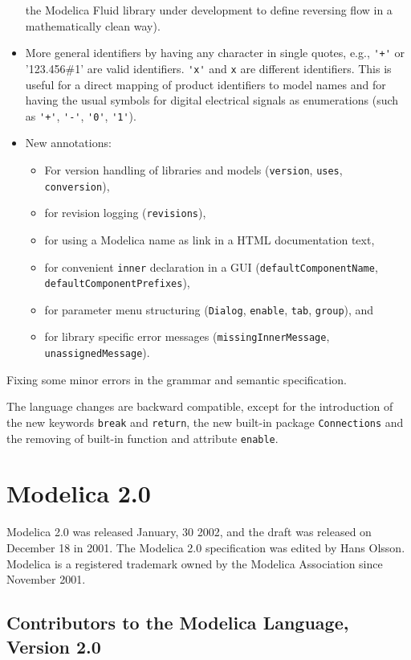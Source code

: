 \begin{itemize}
  the Modelica Fluid library under development to define reversing flow
  in a mathematically clean way).
\item
  More general identifiers by having any character in single quotes,
  e.g., \lstinline!'+'! or '123.456\#1' are valid identifiers. \lstinline!'x'! and \lstinline!x! are
  different identifiers. This is useful for a direct mapping of product
  identifiers to model names and for having the usual symbols for
  digital electrical signals as enumerations (such as \lstinline!'+'!, \lstinline!'-'!, \lstinline!'0'!,
  \lstinline!'1'!).
\item
  New annotations:
\begin{itemize}
\item For version handling of libraries and models (\lstinline!version!, \lstinline!uses!,
\lstinline!conversion!),
\item for revision logging (\lstinline!revisions!),
\item for using a Modelica name as link in a HTML documentation text,
\item for convenient \lstinline!inner! declaration in a GUI (\lstinline!defaultComponentName!,
\lstinline!defaultComponentPrefixes!),
\item for parameter menu structuring (\lstinline!Dialog!, \lstinline!enable!, \lstinline!tab!,
\lstinline!group!), and
\item for library specific error messages (\lstinline!missingInnerMessage!,
\lstinline!unassignedMessage!).
\end{itemize}
\end{itemize}
Fixing some minor errors in the grammar and semantic specification.

The language changes are backward compatible, except for the introduction of the new keywords \lstinline!break! and \lstinline!return!, the new built-in package \lstinline!Connections! and the removing of built-in function and attribute \lstinline!enable!.

\section{Modelica 2.0}\label{modelica-2-0}

Modelica 2.0 was released January, 30 2002, and the draft was released
on December 18 in 2001. The Modelica 2.0 specification was edited by
Hans Olsson. Modelica is a registered trademark owned by the Modelica
Association since November 2001.

\subsection{Contributors to the Modelica Language, Version 2.0}\label{contributors-to-the-modelica-language-version-2-0}

